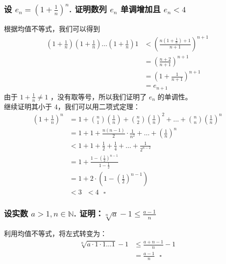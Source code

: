 \documentclass{article}
\begin{document}
\subsubsection{设 $e_{n} = (1 + \frac{1}{n})^n$. 证明数列 $e_n$ 单调增加且 $e_n < 4$}
根据均值不等式，我们可以得到
\begin{align*}
    (1 + \frac{1}{n})(1 + \frac{1}{n})\dots(1 + \frac{1}{n})1 &< (\frac{n(1 + \frac{1}{n}) + 1}{n + 1})^{n + 1}\\
    &= (\frac{n+2}{n+1})^{n+1}\\
    &= (1 + \frac{1}{n + 1})^{n+1}\\
    &= e_{n+1}
\end{align*}
由于 $1 + \frac{1}{n} \neq 1$ ，没有取等号，所以我们证明了 $e_n$ 的单调性。\\
继续证明其小于 $4$，我们可以用二项式定理：
\begin{align*}
    (1 + \frac{1}{n})^n &= 1 + \binom{n}{1}(\frac{1}{n}) + \binom{n}{2}(\frac{1}{n})^2 + \dots + \binom{n}{n}(\frac{1}{n})^n \\
    &= 1 + 1 + \frac{n(n-1)}{2} \cdot \frac{1}{n^2} + \dots + (\frac{1}{n})^n \\
    &< 1 + 1 + \frac{1}{2} + \frac{1}{4} + \dots + \frac{1}{2^{n-2}} \\
    &= 1 + \frac{1-(\frac{1}{2})^{n-1}}{1-\frac{1}{2}} \\
    &= 1 + 2 \cdot (1 - (\frac{1}{2})^{n-1}) \\
    &< 3
    \text{    } < 4 \text{ } \square
\end{align*}
\subsubsection{设实数 $a > 1, n \in \mathbb{N}$. 证明：$\sqrt[n]{a} - 1 \leq \frac{a-1}{n}$}
利用均值不等式，将左式转变为：
\begin{align*}
    \sqrt[n]{a \cdot 1 \cdot 1 \dots 1} - 1 &\leq \frac{a + n - 1}{n} - 1 \\
    &= \frac{a-1}{n} \text{ } \square
\end{align*}
\end{document}
